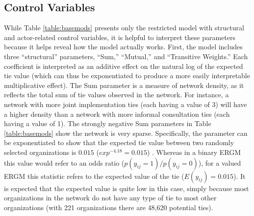 \documentclass[12pt,a4paper,titlepage]{article}
\begin{document}
\subsection{Control Variables}

While Table \ref{table:basemods} presents only the restricted model with structural and actor-related control variables, it is helpful to interpret these parameters because it helps reveal how the model actually works. First, the model includes three “structural” parameters, “Sum,” “Mutual,” and “Transitive Weights.”  Each coefficient is interpreted as an additive effect on the natural log of the expected tie value (which can thus be exponentiated to produce a more easily interpretable multiplicative effect). The Sum parameter is a measure of network density, as it reflects the total sum of tie values observed in the network. For instance, a network with more joint implementation ties (each having a value of 3) will have a higher density than a network with more informal consultation ties (each having a value of 1). The strongly negative Sum parameters in Table \ref{table:basemods} show the network is very sparse. Specifically, the parameter can be exponentiated to show that the expected tie value between two randomly selected organizations is $0.015$ ($exp^{-4.18} = 0.015$) \parencite{krivitsky2012}. Whereas in a binary ERGM this value would refer to an odds ratio ($p(y_{ij}=1) / p(y_{ij}=0)$), for a valued ERGM this statistic refers to the expected value of the tie ($E(y_{ij})=0.015$). It is expected that the expected value is quite low in this case, simply because most organizations in the network do not have any type of tie to most other organizations (with 221 organizations there are 48,620 potential ties).

\singlespacing

\doublespacing
\end{document}
